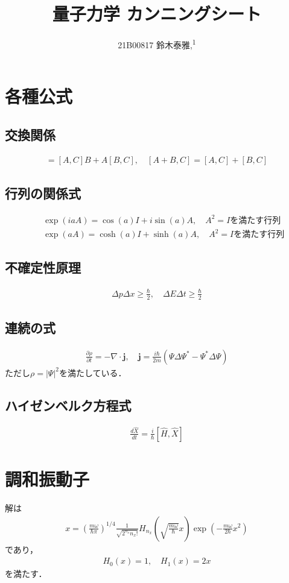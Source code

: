 \documentclass[12pt,dvipdfmx]{jsarticle}
\newcommand\authormark[1]{\textsuperscript{#1}}
\begin{document}
\title{量子力学 カンニングシート}

\author{21B00817 鈴木泰雅,\authormark{1}}
\section*{\Large{各種公式}}
\subsection*{交換関係}
\begin{eqnarray}
  [AB,C] = [A,C]B + A[B,C],\quad [A+B,C] = [A,C] + [B,C]
\end{eqnarray}
\subsection*{行列の関係式}
\begin{eqnarray}
  &&\exp(iaA) = \cos(a)I +i\sin(a)A,\quad A^2 =I を満たす行列\\
  &&\exp(aA) = \cosh(a)I +\sinh(a)A,\quad A^2 =I を満たす行列
\end{eqnarray}
\subsection*{不確定性原理}
\begin{eqnarray}
  \Delta p\Delta x \geq \frac{\hbar}{2},\quad \Delta E\Delta t \geq\frac{\hbar}{2}
\end{eqnarray}
\subsection*{連続の式}
\begin{eqnarray}
  \frac{\partial\rho}{\partial t} = -\nabla\cdot\bm{j},\quad \bm{j} = \frac{i\hbar}{2m}\left( \Psi\Delta\Psi^{*}-\Psi^{*}\Delta\Psi \right)
\end{eqnarray}
ただし$\rho=|\Psi|^2$を満たしている．
\subsection*{ハイゼンベルク方程式}
\begin{eqnarray}
  \frac{d\hat{X}}{dt}  = \frac{i}{\hbar}\left[ \hat{H}, \hat{X} \right]
\end{eqnarray}
\section*{\Large{調和振動子}}
解は
\begin{eqnarray}
  x= \left( \frac{m\omega}{\hbar\pi} \right)^{1/4}\frac{1}{\sqrt{2^{n_x}n_x!}}H_{n_x}\left( \sqrt{\frac{m\omega}{\hbar}}x \right)\exp\left( -\frac{m\omega}{2\hbar}x^2 \right)
\end{eqnarray}
であり，
\begin{eqnarray}
  H_0(x)=1,\quad H_1(x)=2x
\end{eqnarray}
を満たす．
\end{document}
